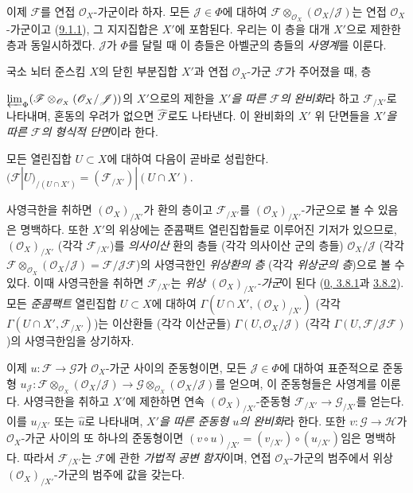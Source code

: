 \begin{env}[10.8.3]
\label{I.10.8.3-ko}
이제 $\mathscr{F}$를 연접 $\mathscr{O}_X$-가군이라 하자. 모든
$\mathscr{J}\in\Phi$에 대하여
$\mathscr{F}\otimes_{\mathscr{O}_X}(\mathscr{O}_X/\mathscr{J})$는
연접 $\mathscr{O}_X$-가군이고
(\hyperref[I.9.1.1-ko]{9.1.1}), 그 지지집합은 $X'$에 포함된다. 우리는
이 층을 대개 $X'$으로 제한한 층과 동일시하겠다. $\mathscr{J}$가
$\Phi$를 달릴 때 이 층들은 아벨군의 층들의
\emph{사영계}를 이룬다.
\end{env}

\begin{definition}[10.8.4]
\label{I.10.8.4-ko}
국소 뇌터 준스킴 $X$의 닫힌 부분집합 $X'$과 연접
$\mathscr{O}_X$-가군 $\mathscr{F}$가 주어졌을 때, 층


$\varprojlim_{\Phi}
(\mathscr{F}\otimes_{\mathscr{O}_X}
(\mathscr{O}_X/\mathscr{J}))$의 $X'$으로의 제한을
\emph{$X'$을 따른 $\mathscr{F}$의 완비화}라 하고
$\mathscr{F}_{/X'}$로 나타내며, 혼동의 우려가 없으면
$\widehat{\mathscr{F}}$로도 나타낸다. 이 완비화의 $X'$ 위 단면들을
\emph{$X'$을 따른 $\mathscr{F}$의 형식적 단면}이라 한다.
\end{definition}

모든 열린집합 $U\subset X$에 대하여 다음이 곧바로 성립한다.
$(\mathscr{F}|U)_{/(U\cap X')}=(\mathscr{F}_{/X'})|(U\cap X')$.

사영극한을 취하면 $(\mathscr{O}_X)_{/X'}$가 환의 층이고
$\mathscr{F}_{/X'}$를 $(\mathscr{O}_X)_{/X'}$-가군으로 볼 수 있음은
명백하다. 또한 $X'$의 위상에는 준콤팩트 열린집합들로 이루어진 기저가
있으므로, $(\mathscr{O}_X)_{/X'}$ (각각 $\mathscr{F}_{/X'}$)를
\emph{의사이산} 환의 층들 (각각 의사이산 군의 층들)
$\mathscr{O}_X/\mathscr{J}$ (각각
$\mathscr{F}\otimes_{\mathscr{O}_X}
(\mathscr{O}_X/\mathscr{J})=\mathscr{F}/\mathscr{J}\mathscr{F}$)의
사영극한인 \emph{위상환의 층} (각각 \emph{위상군의 층})으로 볼 수
있다. 이때 사영극한을 취하면 $\mathscr{F}_{/X'}$는
\emph{위상 $(\mathscr{O}_X)_{/X'}$-가군}이 된다
(\hyperref[0.3.8.1-ko]{0, 3.8.1}과
\hyperref[0.3.8.2-ko]{3.8.2}). 모든 \emph{준콤팩트} 열린집합
$U\subset X$에 대하여
$\Gamma(U\cap X',(\mathscr{O}_X)_{/X'})$ (각각
$\Gamma(U\cap X',\mathscr{F}_{/X'})$)는 이산환들 (각각 이산군들)
$\Gamma(U,\mathscr{O}_X/\mathscr{J})$ (각각
$\Gamma(U,\mathscr{F}/\mathscr{J}\mathscr{F})$)의 사영극한임을
상기하자.

이제 $u:\mathscr{F}\to\mathscr{G}$가 $\mathscr{O}_X$-가군 사이의
준동형이면, 모든 $\mathscr{J}\in\Phi$에 대하여 표준적으로 준동형
$u_{\mathscr{J}}:
\mathscr{F}\otimes_{\mathscr{O}_X}(\mathscr{O}_X/\mathscr{J})
\to
\mathscr{G}\otimes_{\mathscr{O}_X}(\mathscr{O}_X/\mathscr{J})$를 얻으며,
이 준동형들은 사영계를 이룬다. 사영극한을 취하고 $X'$에 제한하면
연속 $(\mathscr{O}_X)_{/X'}$-준동형
$\mathscr{F}_{/X'}\to\mathscr{G}_{/X'}$를 얻는다. 이를
$u_{/X'}$ 또는 $\widehat u$로 나타내며,
\emph{$X'$을 따른 준동형 $u$의 완비화}라 한다. 또한
$v:\mathscr{G}\to\mathscr{H}$가 $\mathscr{O}_X$-가군 사이의
또 하나의 준동형이면
$(v\circ u)_{/X'}=(v_{/X'})\circ(u_{/X'})$임은 명백하다. 따라서
$\mathscr{F}_{/X'}$는 $\mathscr{F}$에 관한
\emph{가법적 공변 함자}이며, 연접 $\mathscr{O}_X$-가군의 범주에서
위상 $(\mathscr{O}_X)_{/X'}$-가군의 범주에 값을 갖는다.

